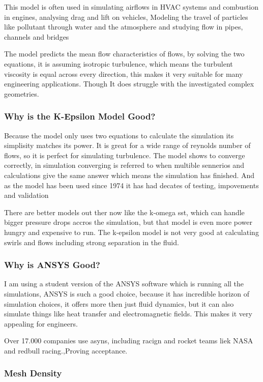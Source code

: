 \documentclass[12pt,a4paper]{article}
\begin{document}
This model is often used in simulating airflows in HVAC systems and combustion in engines, analysing drag and lift on vehicles, Modeling the travel of particles like pollutant through water and the atmosphere and studying flow in pipes, channels and bridges

The model predicts the mean flow characteristics of flows, by solving the two equations, it is assuming isotropic turbulence, which means the turbulent viscosity is equal across every direction, this makes it very suitable for many engineering applications. Though It does struggle with the investigated complex geometries.

\subsubsection{Why is the K-Epsilon Model Good?}

Because the model only uses two equations to calculate the simulation its simplisity matches its power. It is great for a wide range of reynolds number of flows, so it is perfect for simulating turbulence. The model shows to converge correctly, in simulation converging is referred to when multible sennerios and calculations give the same answer which means the simulation has finished. And as the model has been used since 1974 it has had decates of testing, impovements and validation

There are better models out ther now like the k-omega sst, which can handle bigger pressure drops accros the simulation, but that model is even more power hungry and expensive to run. The k-epsilon model is not very good at calculating swirls and flows including strong separation in the fluid.

\subsubsection{Why is ANSYS Good?}

I am using a student version of the ANSYS software which is running all the simulations, ANSYS is such a good choice, because it has incredible horizon of simulation choices, it offers more then just fluid dynamics, but it can also simulate things like heat transfer and electromagnetic fields. This makes it very appealing for engineers. 

Over 17.000 companies use asyns, including racign and rocket teams liek NASA and redbull racing.,Proving acceptance. 

\subsubsection{Mesh Density}
\end{document}
